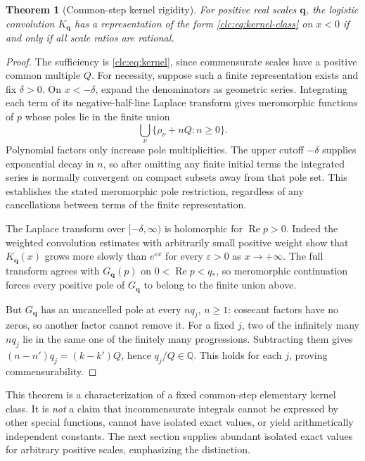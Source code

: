\documentclass[11pt,a4paper]{article}
\numberwithin{equation}{section}
\newtheorem{theorem}{Theorem}[section]
\theoremstyle{definition}\newtheorem{definition}[theorem]{Definition}
\theoremstyle{remark}\newtheorem{remark}[theorem]{Remark}
\DeclareMathOperator{\Rea}{Re}
\newcommand{\bq}{\boldsymbol q}\newcommand{\bs}{\boldsymbol s}
\begin{document}
\begin{theorem}[Common-step kernel rigidity]\label{clc:thm:commensurate}
For positive real scales $\bq$, the logistic convolution $K_{\bq}$
has a representation of the form \eqref{clc:eq:kernel-class} on $x<0$
if and only if all scale ratios are rational.
\end{theorem}
\begin{proof}
The sufficiency is \eqref{clc:eq:kernel}, since commensurate scales have
a positive common multiple $Q$.
For necessity, suppose such a finite representation exists and fix
$\delta>0$. On $x< -\delta$, expand the denominators as geometric
series. Integrating each term of its negative-half-line Laplace
transform gives meromorphic functions of $p$ whose poles lie in the
finite union
\[
 \bigcup_\nu\{\rho_\nu+nQ:n\ge0\}.
\]
Polynomial factors only increase pole multiplicities. The upper cutoff
$-\delta$ supplies exponential decay in $n$, so after omitting any
finite initial terms the integrated series is normally convergent on
compact subsets away from that pole set. This establishes the stated
meromorphic pole restriction, regardless of any cancellations between
terms of the finite representation.

The Laplace transform over $[-\delta,\infty)$ is holomorphic for
$\Rea p>0$. Indeed the weighted convolution estimates with arbitrarily
small positive weight show that $K_{\bq}(x)$ grows more slowly than
$e^{\varepsilon x}$ for every $\varepsilon>0$ as $x\to+\infty$.
The full transform agrees with $G_{\bq}(p)$ on $0<\Rea p<q_*$,
so meromorphic continuation forces every positive pole of $G_{\bq}$
to belong to the finite union above.

But $G_{\bq}$ has an uncancelled pole at every $nq_j$, $n\ge1$:
cosecant factors have no zeros, so another factor cannot remove it.
For a fixed $j$, two of the infinitely many $nq_j$ lie in the same
one of the finitely many progressions. Subtracting them gives
$(n-n')q_j=(k-k')Q$, hence $q_j/Q\in\mathbb Q$.
This holds for each $j$, proving commensurability.
\end{proof}

This theorem is a characterization of a fixed common-step elementary
kernel class. It is \emph{not} a claim that incommensurate integrals
cannot be expressed by other special functions, cannot have isolated
exact values, or yield arithmetically independent constants.
The next section supplies abundant isolated exact values for arbitrary
positive scales, emphasizing the distinction.
\end{document}
